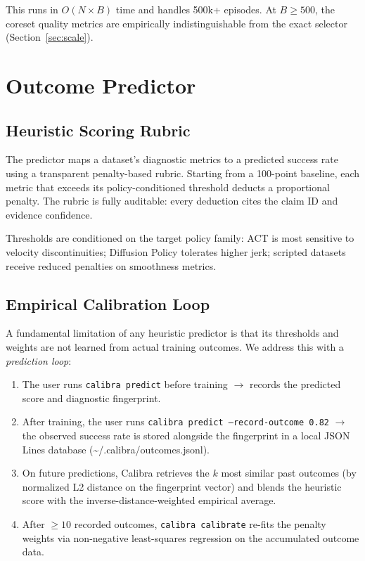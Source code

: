 \documentclass[10pt,twocolumn]{article}
\begin{document}
This runs in $O(N \times B)$ time and handles 500k+ episodes.
At $B \geq 500$, the coreset quality metrics are empirically
indistinguishable from the exact selector (Section~\ref{sec:scale}).

\section{Outcome Predictor}
\label{sec:predictor}

\subsection{Heuristic Scoring Rubric}
The predictor maps a dataset's diagnostic metrics to a predicted success rate
using a transparent penalty-based rubric. Starting from a 100-point baseline,
each metric that exceeds its policy-conditioned threshold deducts a
proportional penalty. The rubric is fully auditable: every deduction cites
the claim ID and evidence confidence.

Thresholds are conditioned on the target policy family: ACT is most sensitive
to velocity discontinuities; Diffusion Policy tolerates higher jerk; scripted
datasets receive reduced penalties on smoothness metrics.

\subsection{Empirical Calibration Loop}
\label{sec:calibration}
A fundamental limitation of any heuristic predictor is that its thresholds and
weights are not learned from actual training outcomes. We address this with a
\emph{prediction loop}:

\begin{enumerate}[nosep]
  \item The user runs \texttt{calibra predict} before training $\to$ records
    the predicted score and diagnostic fingerprint.
  \item After training, the user runs
    \texttt{calibra predict --record-outcome 0.82} $\to$ the observed success
    rate is stored alongside the fingerprint in a local JSON Lines database
    (\textasciitilde/.calibra/outcomes.jsonl).
  \item On future predictions, Calibra retrieves the $k$ most similar past
    outcomes (by normalized L2 distance on the fingerprint vector) and blends
    the heuristic score with the inverse-distance-weighted empirical average.
  \item After $\geq 10$ recorded outcomes, \texttt{calibra calibrate}
    re-fits the penalty weights via non-negative least-squares regression on
    the accumulated outcome data.
\end{enumerate}
\end{document}
